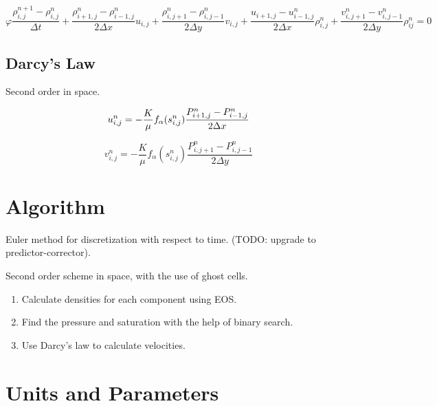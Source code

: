 \documentclass[a4paper,12pt]{article}
\begin{document}
\[
\varphi \frac{\rho^{n + 1}_{i, j} - \rho^n_{i, j}}{\Delta t}
+ \frac{\rho_{i+1, j}^n - \rho_{i-1,j}^n}{2\Delta x} u_{i,j}
+ \frac{\rho_{i, j+1}^n - \rho_{i,j-1}^n}{2\Delta y} v_{i,j}
+ \frac{u_{i+1, j} - u_{i-1,j}^n}{2\Delta x} \rho_{i,j}^n
+ \frac{v_{i, j+1}^n - v_{i,j-1}^n}{2\Delta y} \rho_{ij}^n = 0
\] 

\subsection{Darcy's Law}

Second order in space.

\[
    u_{i,j}^n = -\frac{K}{\mu} f_\alpha (s_{i, j}^n)
    \frac{P_{i + 1, j}^n - P_{i - 1, j}^n}{2\Delta x} \\
\] 

\[
    v_{i,j}^n = -\frac{K}{\mu} f_\alpha(s_{i, j}^n)
    \frac{P_{i, j + 1}^n - P_{i, j - 1}^n}{2\Delta y}
\] 

\section{Algorithm}

Euler method for discretization with respect to time.
(TODO: upgrade to predictor-corrector).

Second order scheme in space, with the use of ghost cells. 

\begin{enumerate}
    \item Calculate densities for each component using EOS.
    \item Find the pressure and saturation with the
        help of binary search.
    \item Use Darcy's law to calculate velocities.
\end{enumerate}

\section{Units and Parameters}
\end{document}
